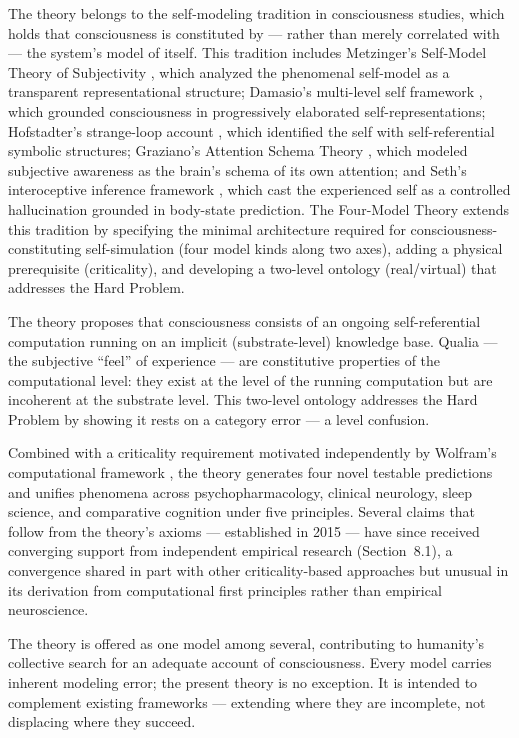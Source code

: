 \documentclass[12pt]{article}
\newcommand{\rev}[1]{#1}
\newcommand{\revstart}{}
\newcommand{\revend}{}
\begin{document}
The theory belongs to the self-modeling tradition in consciousness studies, which holds that consciousness is constituted by --- rather than merely correlated with --- the system's model of itself. This tradition includes Metzinger's Self-Model Theory of Subjectivity \citep{Metzinger2003,Metzinger2009}, which analyzed the phenomenal self-model as a transparent representational structure; Damasio's multi-level self framework \citep{Damasio1999,Damasio2010}, which grounded consciousness in progressively elaborated self-representations; Hofstadter's strange-loop account \citep{Hofstadter2007}, which identified the self with self-referential symbolic structures; Graziano's Attention Schema Theory \citep{Graziano2013}, which modeled subjective awareness as the brain's schema of its own attention; and Seth's interoceptive inference framework \citep{Seth2021,SethBayne2022}, which cast the experienced self as a controlled hallucination grounded in body-state prediction. The Four-Model Theory extends this tradition by specifying the minimal architecture required for consciousness-constituting self-simulation (four model kinds along two axes), adding a physical prerequisite (criticality), and developing a two-level ontology (real/virtual) that addresses the Hard Problem.

The theory proposes that consciousness consists of an ongoing self-referential computation running on an implicit (substrate-level) knowledge base. Qualia --- the subjective ``feel'' of experience --- are constitutive properties of the computational level: they exist at the level of the running computation but are incoherent at the substrate level. This two-level ontology addresses the Hard Problem by showing it rests on a category error --- a level confusion.

Combined with a criticality requirement \rev{motivated} independently by Wolfram's computational framework \citep{Wolfram2002}, the theory generates four novel testable predictions and unifies phenomena across psychopharmacology, clinical neurology, sleep science, and comparative cognition under five principles. {\revstart Several claims that follow from the theory's axioms --- established in 2015 --- have since received converging support from independent empirical research (Section~8.1), a convergence shared in part with other criticality-based approaches but unusual in its derivation from computational first principles rather than empirical neuroscience.\revend}

The theory is offered as one model among several, contributing to humanity's collective search for an adequate account of consciousness. Every model carries inherent modeling error; the present theory is no exception. It is intended to complement existing frameworks --- extending where they are incomplete, not displacing where they succeed.
\end{document}
